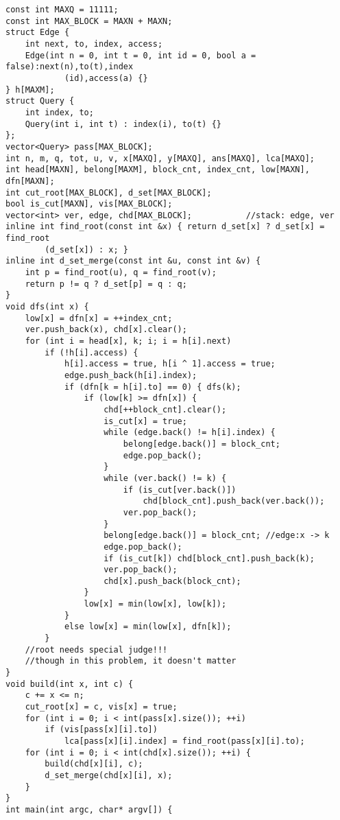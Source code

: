 \documentclass{article}
\begin{document}
\begin{lstlisting}
const int MAXQ = 11111;
const int MAX_BLOCK = MAXN + MAXN;
struct Edge {
    int next, to, index, access;
    Edge(int n = 0, int t = 0, int id = 0, bool a = false):next(n),to(t),index
            (id),access(a) {}
} h[MAXM];
struct Query {
    int index, to;
    Query(int i, int t) : index(i), to(t) {}
};
vector<Query> pass[MAX_BLOCK];
int n, m, q, tot, u, v, x[MAXQ], y[MAXQ], ans[MAXQ], lca[MAXQ];
int head[MAXN], belong[MAXM], block_cnt, index_cnt, low[MAXN], dfn[MAXN];
int cut_root[MAX_BLOCK], d_set[MAX_BLOCK];
bool is_cut[MAXN], vis[MAX_BLOCK];
vector<int> ver, edge, chd[MAX_BLOCK];           //stack: edge, ver
inline int find_root(const int &x) { return d_set[x] ? d_set[x] = find_root
        (d_set[x]) : x; }
inline int d_set_merge(const int &u, const int &v) {
    int p = find_root(u), q = find_root(v);
    return p != q ? d_set[p] = q : q;
}
void dfs(int x) {
    low[x] = dfn[x] = ++index_cnt;
    ver.push_back(x), chd[x].clear();
    for (int i = head[x], k; i; i = h[i].next)
        if (!h[i].access) {
            h[i].access = true, h[i ^ 1].access = true;
            edge.push_back(h[i].index);
            if (dfn[k = h[i].to] == 0) { dfs(k);
                if (low[k] >= dfn[x]) {
                    chd[++block_cnt].clear();
                    is_cut[x] = true;
                    while (edge.back() != h[i].index) {
                        belong[edge.back()] = block_cnt;
                        edge.pop_back();
                    }
                    while (ver.back() != k) {
                        if (is_cut[ver.back()])
                            chd[block_cnt].push_back(ver.back());
                        ver.pop_back();
                    }
                    belong[edge.back()] = block_cnt; //edge:x -> k
                    edge.pop_back();
                    if (is_cut[k]) chd[block_cnt].push_back(k);
                    ver.pop_back();
                    chd[x].push_back(block_cnt);
                }
                low[x] = min(low[x], low[k]);
            }
            else low[x] = min(low[x], dfn[k]);
        }
    //root needs special judge!!!
    //though in this problem, it doesn't matter
}
void build(int x, int c) {
    c += x <= n;
    cut_root[x] = c, vis[x] = true;
    for (int i = 0; i < int(pass[x].size()); ++i)
        if (vis[pass[x][i].to])
            lca[pass[x][i].index] = find_root(pass[x][i].to);
    for (int i = 0; i < int(chd[x].size()); ++i) {
        build(chd[x][i], c);
        d_set_merge(chd[x][i], x);
    }
}
int main(int argc, char* argv[]) {

\end{lstlisting}
\end{document}
